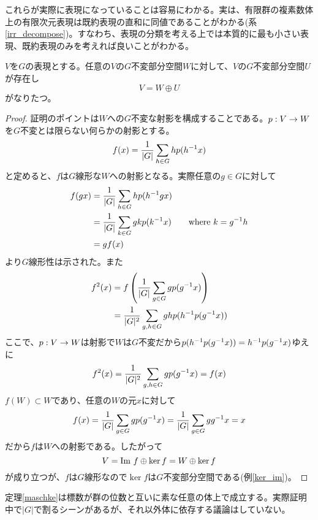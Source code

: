 \documentclass{ltjsarticle}
\begin{document}
  これらが実際に表現になっていることは容易にわかる。実は、有限群の複素数体上の有限次元表現は既約表現の直和に同値であることがわかる(系\ref{irr_decompose})。すなわち、表現の分類を考える上では本質的に最も小さい表現、既約表現のみを考えれば良いことがわかる。

  \begin{theo}[Maschkeの定理]\label{maschke}
    $V$を$G$の表現とする。任意の$V$の$G$不変部分空間$W$に対して、$V$の$G$不変部分空間$U$が存在し
    \[
    V= W\oplus U
    \]
    がなりたつ。
  \end{theo}

  \begin{proof}
    証明のポイントは$W$への$G$不変な射影を構成することである。$p:V\rightarrow W$を$G$不変とは限らない何らかの射影とする。
    \[
    f(x)=\frac{1}{|G|}\sum_{h\in G} hp(h^{-1}x)
    \]
    と定めると、$f$は$G$線形な$W$への射影となる。実際任意の$g\in G$に対して
    \begin{align*}
      f(gx)&=\frac{1}{|G|}\sum_{h\in G} hp(h^{-1}gx)\\
      &=\frac{1}{|G|}\sum_{k\in G} gkp(k^{-1}x)\qquad \text{where $k=g^{-1}h$}\\
      &=gf(x)
    \end{align*}
    より$G$線形性は示された。また
    \begin{align*}
      f^2(x)&=f\left(\frac{1}{|G|}\sum_{g\in G}gp(g^{-1}x)\right)\\
      &=\frac{1}{|G|^2}\sum_{g,h\in G}ghp(h^{-1}p(g^{-1}x))
    \end{align*}
    ここで、$p:V\rightarrow W$は射影で$W$は$G$不変だから$p(h^{-1}p(g^{-1}x))=h^{-1}p(g^{-1}x)$ゆえに
    \begin{align*}
      f^2(x)=\frac{1}{|G|^2}\sum_{g,h\in G}gp(g^{-1}x)=f(x)
    \end{align*}
    $f(W)\subset W$であり、任意の$W$の元$x$に対して
    \[
    f(x)=\frac{1}{|G|}\sum_{g\in G}gp(g^{-1}x)=\frac{1}{|G|}\sum_{g\in G}gg^{-1}x=x  
    \]
    だから$f$は$W$への射影である。したがって
    \[
    V=\text{Im } f\oplus \ker f=W\oplus \ker f  
    \]
    が成り立つが、$f$は$G$線形なので$\ker f$は$G$不変部分空間である(例\ref{ker_im})。
  \end{proof}

  \begin{notice}
    定理\ref{maschke}は標数が群の位数と互いに素な任意の体上で成立する。実際証明中で$|G|$で割るシーンがあるが、それ以外体に依存する議論はしていない。
  \end{notice}
\end{document}
